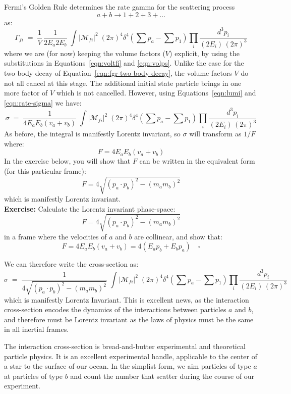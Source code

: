 \documentclass[12pt]{article}
\begin{document}
Fermi's Golden Rule determines the rate gamma for the scattering process
$$a + b \to 1 + 2 + 3 + \ldots$$
as:
$$\Gamma_{fi} \; = \; \frac{1}{V} \, \frac{1}{ 2 E_a 2 E_b} \;
\int |\mathcal{M}_{fi}|^2 \; (2\pi)^4 \delta^4(\sum p_a - \sum p_1)
\prod_i \frac{d^3p_i}{(2 E_i) \, (2\pi)^3 }$$ where we are (for now)
keeping the volume factors ($V$) explicit, by using the substitutions
in Equations~\ref{eqn:voltfi} and \ref{eqn:volps}.  Unlike the case
for the two-body decay of Equation~\ref{eqn:fgr-two-body-decay}, the
volume factors $V$ do not all cancel at this stage.  The additional
initial state particle brings in one more factor of $V$ which is not
cancelled.  However, using Equations~\ref{eqn:lumi} and \ref{eqn:rate-sigma} we have:
$$\sigma \; = \; \frac{1}{4 E_a E_b (v_a + v_b)} \;
\int |\mathcal{M}_{fi}|^2 \; (2\pi)^4 \delta^4(\sum p_a - \sum p_1)
\prod_i \frac{d^3p_i}{(2 E_i) \, (2\pi)^3 }$$
As before, the integral is manifestly Lorentz invariant, so $\sigma$ will transform as $1/F$ where:
$$F = 4 E_a E_b (v_a + v_b)$$
In the exercise below, you will show that $F$ can be written in the
equivalent form (for this particular frame):
\begin{equation}
\label{eqn:lorentz-invariant-flux}
F = 4 \sqrt{(p_a\cdot p_b)^2 - (m_a m_b)^2}
\end{equation}
which is manifestly Lorentz invariant.\\[4pt]

\noindent
{\bf Exercise:} Calculate the Lorentz invariant phase-space:
$$ F = 4 \sqrt{(p_a\cdot p_b)^2 - (m_a m_b)^2}$$
in a frame where the velocities of $a$ and $b$ are collinear, and show that:
$$F = 4 E_a E_b (v_a + v_b) = 4(E_a p_b + E_b p_a) \quad \square$$

We can therefore write the cross-section as:
$$\sigma \; = \; \frac{1}{4 \sqrt{(p_a\cdot p_b)^2 - (m_a m_b)^2}} \;
\int |\mathcal{M}_{fi}|^2 \; (2\pi)^4 \delta^4(\sum p_a - \sum p_1)
\prod_i \frac{d^3p_i}{(2 E_i) \, (2\pi)^3 }$$
which is manifestly Lorentz Invariant.  This is excellent news, as the
interaction cross-section encodes the dynamics of the interactions
between particles $a$ and $b$, and therefore must be Lorentz invariant
as the laws of physics must be the same in all inertial frames.

The interaction cross-section is bread-and-butter experimental and
theoretical particle physics.  It is an excellent experimental handle,
applicable to the center of a star to the surface of our ocean.  In
the simplist form, we aim particles of type $a$ at particles of type
$b$ and count the number that scatter during the course of our
experiment.\\[5pt]
\end{document}
